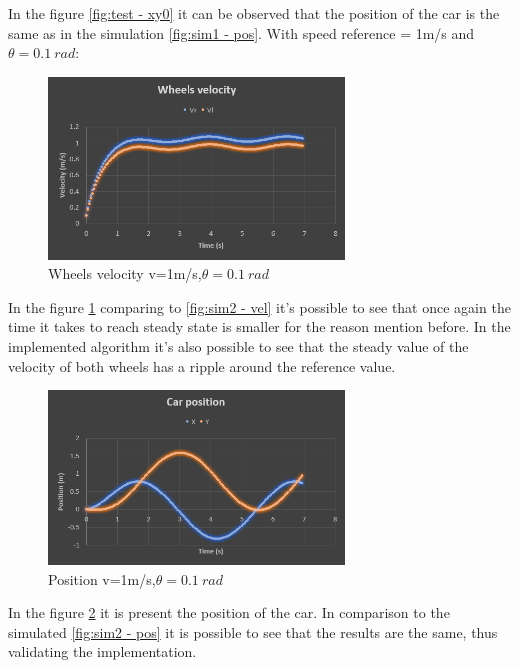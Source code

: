 In the figure \ref{fig:test - xy0} it can be observed that the position of the car is the same as in the simulation \ref{fig:sim1 - pos}.
\newline
With speed reference = 1m/s and $\theta = 0.1~\si{rad}$:
\begin{figure}[!h]
\centering
\includegraphics[width=0.7\textwidth]{./img/testv1t01.PNG}
\caption {\label{fig:test - vel01}Wheels velocity v=1m/s,$\theta = 0.1~\si{rad}$}
\end{figure}
In the figure \ref{fig:test - vel01} comparing to \ref{fig:sim2 - vel} it's possible to see that once again the time it takes to reach steady state is smaller for the reason mention before. In the implemented algorithm it's also possible to see that the steady value of the velocity of both wheels has a ripple around the reference value. 
\begin{figure}[!h]
\centering
\includegraphics[width=0.7\textwidth]{./img/testx1t01.PNG}
\caption {\label{fig:test - xy01}Position v=1m/s,$\theta = 0.1~\si{rad}$}
\end{figure}
In the figure \ref{fig:test - xy01} it is present the position of the car. In comparison to the simulated \ref{fig:sim2 - pos} it is possible to see that the results are the same, thus validating the implementation.
